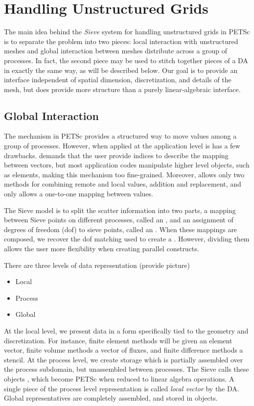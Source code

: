 \section{Handling Unstructured Grids}

    The main idea behind the \emph{Sieve} system for handling unstructured grids in PETSc is to separate the problem
into two pieces: local interaction with unstructured meshes and global interaction between meshes distribute across a
group of processes. In fact, the second piece may be used to stitch together pieces of a DA in exactly the same way, as
will be described below. Our goal is to provide an interface independent of spatial dimension, discretization, and
details of the mesh, but does provide more structure than a purely linear-algebraic interface.

\subsection{Global Interaction}

    The  mechanism in PETSc provides a structured way to move values among a group of
processes. However, when applied at the application level is has a few drawbacks.  demands that the
user provide indices to describe the mapping between vectors, but most application codes manipulate higher level
objects, such as elements, making this mechanism too fine-grained. Moreover,  allows only two methods
for combining remote and local values, addition and replacement, and only allows a one-to-one mapping between values.

    The Sieve model is to split the scatter information into two parts, a mapping between Sieve points on different
processes, called an , and an assignment of degrees of freedom (dof) to sieve points, called an
. When these mappings are composed, we recover the dof matching used to create a . However,
dividing them allows the user more flexibility when creating parallel constructs.

There are three levels of data representation (provide picture)
\begin{itemize}
  \item Local

  \item Process

  \item Global
\end{itemize}
At the local level, we present data in a form specifically tied to the geometry and discretization. For instance, finite
element methods will be given an element vector, finite volume methods a vector of fluxes, and finite difference methods
a stencil. At the process level, we create storage which is partially assembled over the process subdomain, but
unassembled between processes. The Sieve calls these objects , which become PETSc  when
reduced to linear algebra operations. A single piece of the process level representation is called \emph{local vector}
by the DA. Global representatives are completely assembled, and stored in  objects.

